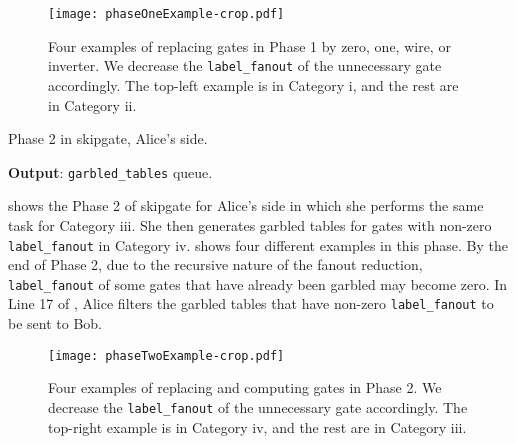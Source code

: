 \begin{figure}
    \centering
    \texttt{[image: phaseOneExample-crop.pdf]}
    \caption{Four examples of replacing gates in Phase 1 by zero, one, wire, or inverter.
    We decrease the \texttt{label\_fanout} of the unnecessary gate accordingly.
    The top-left example is in Category i, and the rest are in Category ii.}
    \label{fig:phaseOneExample}
\end{figure}

\begin{algorithm}
\caption{Phase 2 in \gls{skipgate}, Alice's side.}\label{alg:phase2_alice}
\textbf{Output}: \texttt{garbled\_tables} queue.\\
\begin{algorithmic}[1]
		\ENDIF
	\ELSE {}
    \ENDIF
	\ENDIF
\ENDFOR
{}
\end{algorithmic}
\end{algorithm}

 shows the Phase 2 of \gls{skipgate} for Alice's side in which she performs the same task for Category iii.
She then generates garbled tables for gates with non-zero \texttt{label\_fanout} in Category iv.
 shows four different examples in this phase.
By the end of Phase 2, due to the recursive nature of the fanout reduction, \texttt{label\_fanout} of some gates that have already been garbled may become zero.
In Line 17 of , Alice filters the garbled tables that have non-zero \texttt{label\_fanout} to be sent to Bob.

\begin{figure}
    \centering
    \texttt{[image: phaseTwoExample-crop.pdf]}
    \caption{Four examples of replacing and computing gates in Phase 2.
    		     We decrease the \texttt{label\_fanout} of the unnecessary gate accordingly.
             The top-right example is in Category iv, and the rest are in Category iii.}
    \label{fig:phaseTwoExample}
\end{figure}

